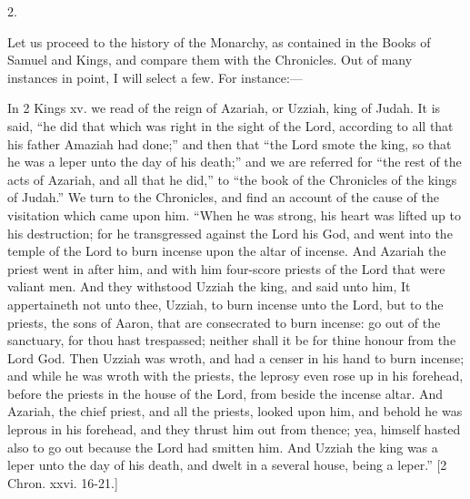 2.

Let us proceed to the history of the Monarchy, as contained in the
Books of Samuel and Kings, and compare them with the Chronicles. Out
of many instances in point, I will select a few. For instance:—

In 2 Kings xv. we read of the reign of Azariah, or Uzziah, king of
Judah. It is said, ``he did that which was right in the sight of
the Lord, according to all that his father Amaziah had done;'' and
then that ``the Lord smote the king, so that he was a leper unto
the day of his death;'' and we are referred for ``the rest of
the acts of Azariah, and all that he did,'' to ``the book of
the Chronicles of the kings of Judah.'' We turn to the Chronicles,
and find an account of the cause of the visitation which came upon
him. ``When he was strong, his heart was lifted up to his
destruction; for he transgressed against the Lord his God, and
went into the temple of the Lord to burn incense upon the altar of
incense. And Azariah the priest went in after him, and with him
four-score priests of the Lord that were valiant men. And they
withstood Uzziah the king, and said unto him, It appertaineth not unto
thee, Uzziah, to burn incense unto the Lord, but to the priests, the
sons of Aaron, that are consecrated to burn incense: go out of the
sanctuary, for thou hast trespassed; neither shall it be for thine
honour from the Lord God. Then Uzziah was wroth, and had a censer in
his hand to burn incense; and while he was wroth with the priests, the
leprosy even rose up in his forehead, before the priests in the house
of the Lord, from beside the incense altar. And Azariah, the chief
priest, and all the priests, looked upon him, and behold he was
leprous in his forehead, and they thrust him out from thence; yea,
himself hasted also to go out because the Lord had smitten him. And
Uzziah the king was a leper unto the day of his death, and dwelt in a
several house, being a leper.'' [2 Chron. xxvi. 16-21.]

